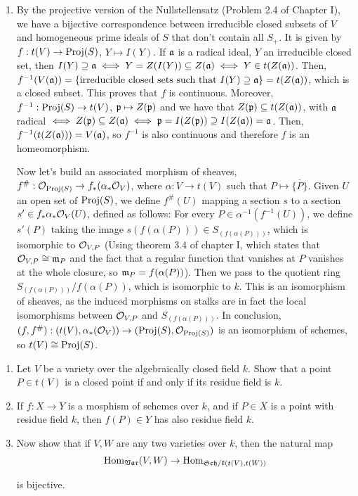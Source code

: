 \begin{sol}
\begin{enumerate}[label=\alph*)]
		\item By the projective version of the Nullstellensatz (Problem 2.4 of Chapter I), we have a bijective correspondence between irreducible closed subsets of $V$ and homogeneous prime ideals of $S$ that don't contain all $S_+$. It is given by $f: t(V) \to \mathrm{Proj}(S)$, $Y \mapsto I(Y)$. If $\mathfrak{a}$ is a radical ideal, $Y$ an irreducible closed set, then $I(Y) \supseteq \mathfrak{a} \iff Y = Z(I(Y)) \subseteq Z(\mathfrak{a}) \iff Y \in t(Z(\mathfrak{a}))$. Then, $f^{-1}(V(\mathfrak{a})) = \{\text{irreducible closed sets such that } I(Y) \supseteq \mathfrak{a} \} = t(Z(\mathfrak{a}))$, which is a closed subset. This proves that $f$ is continuous. Moreover, $f^{-1}: \mathrm{Proj}(S) \to t(V)$, $\mathfrak{p} \mapsto Z(\mathfrak{p})$ and we have that $Z(\mathfrak{p}) \subseteq t(Z(\mathfrak{a}))$, with $\mathfrak{a}$ radical $\iff Z(\mathfrak{p}) \subseteq Z(\mathfrak{a}) \iff \mathfrak{p} = I(Z(\mathfrak{p})) \supseteq I(Z(\mathfrak{a})) = \mathfrak{a}$. Then, $f^{-1}(t(Z(\mathfrak{a}))) = V(\mathfrak{a})$, so $f^{-1}$ is also continuous and therefore $f$ is an homeomorphism.

		Now let's build an associated morphism of sheaves, $f^{\#}: \mathcal{O}_{\mathrm{Proj}(S)} \to f_*(\alpha_* \mathcal{O}_V)$, where $\alpha: V \to t(V)$ such that $P \mapsto \overline{\{P\}}$. Given $U$ an open set of $\mathrm{Proj}(S)$, we define $f^{\#}(U)$ mapping a section $s$ to a section $s' \in f_*\alpha_* \mathcal{O}_V(U)$, defined as follows: For every $P \in \alpha^{-1}(f^{-1}(U))$, we define $s'(P)$ taking the image $s(f(\alpha(P))) \in S_{(f(\alpha(P)))}$, which is isomorphic to $\mathcal{O}_{V,P}$ (Using theorem 3.4 of chapter I, which states that $\mathcal{O}_{V,P} \cong \mathfrak{m}_P$ and the fact that a regular function that vanishes at $P$ vanishes at the whole closure, so $\mathfrak{m}_P = f(\alpha(P))$). Then we pass to the quotient ring $S_{(f(\alpha(P)))}/f(\alpha(P))$, which is isomorphic to $k$. This is an isomorphism of sheaves, as the induced morphisms on stalks are in fact the local isomorphisms between $\mathcal{O}_{V,P}$ and $S_{(f(\alpha(P)))}$. In conclusion, $(f,f^{\#}): (t(V), \alpha_*(\mathcal{O}_V)) \to (\mathrm{Proj}(S), \mathcal{O}_{\mathrm{Proj}(S)})$ is an isomorphism of schemes, so $t(V) \cong \mathrm{Proj}(S)$.		
	\end{enumerate}
\end{sol}

\begin{ex}
	\begin{enumerate}[label=\alph*)]
		\item Let $V$ be a variety over the algebraically closed field $k$. Show that a point $P \in t(V)$ is a closed point if and only if its residue field is $k$.

		\item If $f: X \to Y$ is a mosphism of schemes over $k$, and if $P \in X$ is a point with residue field $k$, then $f(P) \in Y$ has also residue field $k$.

		\item Now show that if $V,W$ are any two varieties over $k$, then the natural map
		\[
			\mathrm{Hom}_{\mathfrak{Var}}(V,W) \to \mathrm{Hom}_{\mathfrak{Sch/k}(t(V),t(W))}
		\]

		is bijective.
	\end{enumerate}
\end{ex}



